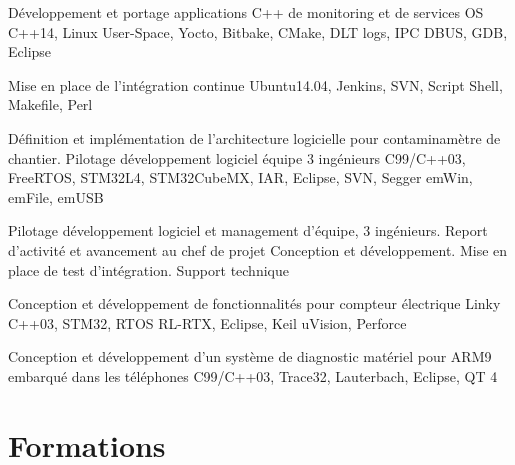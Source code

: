 \documentclass[11pt, a4paper, sans]{moderncv}
\begin{document}

	{Développement et portage applications C++ de monitoring et de services OS}
	{C++14, Linux User-Space, Yocto, Bitbake, CMake, DLT logs, IPC DBUS, GDB, Eclipse}

	{Mise en place de l’intégration continue}
	{Ubuntu14.04, Jenkins, SVN, Script Shell, Makefile, Perl}

	{Définition et implémentation de l’architecture logicielle pour contaminamètre de chantier. Pilotage développement logiciel équipe 3 ingénieurs}
	{C99/C++03, FreeRTOS, STM32L4, STM32CubeMX, IAR, Eclipse, SVN, Segger emWin, emFile, emUSB}

	{Pilotage développement logiciel et management d’équipe, 3 ingénieurs. Report d’activité et avancement au chef de projet}
	{Conception et développement. Mise en place de test d’intégration. Support technique}

	{Conception et développement de fonctionnalités pour compteur électrique Linky}
	{C++03, STM32, RTOS RL-RTX, Eclipse, Keil uVision, Perforce}

	{Conception et développement d’un système de diagnostic matériel pour ARM9 embarqué dans les téléphones}
	{C99/C++03, Trace32, Lauterbach, Eclipse, QT 4}

\section{Formations}
\end{document}
